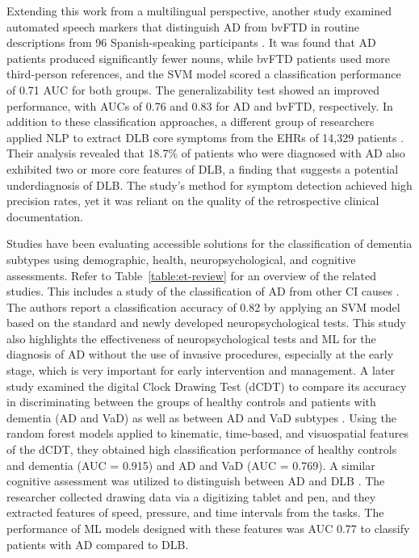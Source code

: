 Extending this work from a multilingual perspective, another study examined automated speech markers that distinguish AD from bvFTD in routine descriptions from 96 Spanish-speaking participants \cite{Lopes2024Automated}. It was found that AD patients produced significantly fewer nouns, while bvFTD patients used more third-person references, and the SVM model scored a classification performance of 0.71 AUC for both groups. The generalizability test showed an improved performance, with AUCs of 0.76 and 0.83 for AD and bvFTD, respectively. In addition to these classification approaches, a different group of researchers applied NLP to extract DLB core symptoms from the EHRs of 14,329 patients \cite{Heybe2025Identifying}. Their analysis revealed that 18.7\% of patients who were diagnosed with AD also exhibited two or more core features of DLB, a finding that suggests a potential underdiagnosis of DLB. The study's method for symptom detection achieved high precision rates, yet it was reliant on the quality of the retrospective clinical documentation.

Studies have been evaluating accessible solutions for the classification of dementia subtypes using demographic, health, neuropsychological, and cognitive assessments. Refer to Table~\ref{table:et-review} for an overview of the related studies. This includes a study of the classification of AD from other CI causes \cite{Gurevich2017Neuropsychological}. The authors report a classification accuracy of 0.82 by applying an SVM model based on the standard and newly developed neuropsychological tests. This study also highlights the effectiveness of neuropsychological tests and ML for the diagnosis of AD without the use of invasive procedures, especially at the early stage, which is very important for early intervention and management. A later study examined the digital Clock Drawing Test (\acrshort{dCDT}) to compare its accuracy in discriminating between the groups of healthy controls and patients with dementia (AD and VaD) as well as between AD and VaD subtypes \cite{Davoudi2021Classifying}. Using the random forest models applied to kinematic, time-based, and visuospatial features of the dCDT, they obtained high classification performance of healthy controls and dementia (AUC = 0.915) and AD and VaD (AUC = 0.769). A similar cognitive assessment was utilized to distinguish between AD and DLB \cite{Yamada2022Characteristics}. The researcher collected drawing data via a digitizing tablet and pen, and they extracted features of speed, pressure, and time intervals from the tasks. The performance of ML models designed with these features was AUC 0.77 to classify patients with AD compared to DLB. 

